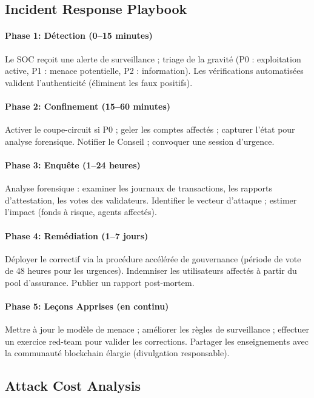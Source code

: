 \documentclass[11pt]{article}
\begin{document}
\subsection{Incident Response Playbook}

\paragraph{Phase 1: Détection (0--15 minutes)}
Le SOC reçoit une alerte de surveillance ; triage de la gravité (P0 : exploitation active, P1 : menace potentielle, P2 : information). Les vérifications automatisées valident l'authenticité (éliminent les faux positifs).

\paragraph{Phase 2: Confinement (15--60 minutes)}
Activer le coupe-circuit si P0 ; geler les comptes affectés ; capturer l'état pour analyse forensique. Notifier le Conseil ; convoquer une session d'urgence.

\paragraph{Phase 3: Enquête (1--24 heures)}
Analyse forensique : examiner les journaux de transactions, les rapports d'attestation, les votes des validateurs. Identifier le vecteur d'attaque ; estimer l'impact (fonds à risque, agents affectés).

\paragraph{Phase 4: Remédiation (1--7 jours)}
Déployer le correctif via la procédure accélérée de gouvernance (période de vote de 48 heures pour les urgences). Indemniser les utilisateurs affectés à partir du pool d'assurance. Publier un rapport post-mortem.

\paragraph{Phase 5: Leçons Apprises (en continu)}
Mettre à jour le modèle de menace ; améliorer les règles de surveillance ; effectuer un exercice red-team pour valider les corrections. Partager les enseignements avec la communauté blockchain élargie (divulgation responsable).

\subsection{Attack Cost Analysis}
\end{document}
